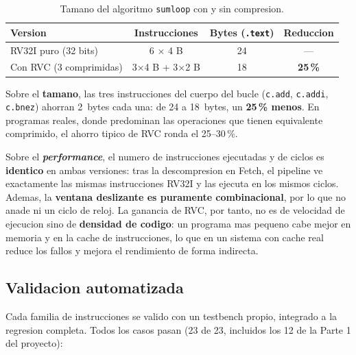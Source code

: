 \documentclass[11pt,a4paper]{article}
\begin{document}
\begin{table}[H]
	\centering
	\small
	\begin{tabular}{@{}lccc@{}}
		\toprule
		\textbf{Version} & \textbf{Instrucciones} & \textbf{Bytes (\texttt{.text})} & \textbf{Reduccion} \\
		\midrule
		RV32I puro (32 bits)      & 6 $\times$ 4 B          & 24 & --- \\
		Con RVC (3 comprimidas)   & 3$\times$4 B + 3$\times$2 B & 18 & \textbf{25\,\%} \\
		\bottomrule
	\end{tabular}
	\caption{Tamano del algoritmo \texttt{sumloop} con y sin compresion.}
	\label{cuadro:comparativa}
\end{table}

Sobre el \textbf{tamano}, las tres instrucciones del cuerpo del bucle
(\texttt{c.add}, \texttt{c.addi}, \texttt{c.bnez}) ahorran 2~bytes cada una: de
24 a 18~bytes, un \textbf{25\,\% menos}. En programas reales, donde predominan
las operaciones que tienen equivalente comprimido, el ahorro tipico de RVC ronda
el 25--30\,\%.

Sobre el \textbf{\textit{performance}}, el numero de instrucciones ejecutadas y
de ciclos es \textbf{identico} en ambas versiones: tras la descompresion en
Fetch, el pipeline ve exactamente las mismas instrucciones RV32I y las ejecuta
en los mismos ciclos. Ademas, la \textbf{ventana deslizante es puramente
combinacional}, por lo que no anade ni un ciclo de reloj. La ganancia de RVC,
por tanto, no es de velocidad de ejecucion sino de \textbf{densidad de codigo}:
un programa mas pequeno cabe mejor en memoria y en la cache de instrucciones,
lo que en un sistema con cache real reduce los fallos y mejora el rendimiento de
forma indirecta.

\subsection{Validacion automatizada}

Cada familia de instrucciones se valido con un testbench propio, integrado a la
regresion completa. Todos los casos pasan (23 de 23, incluidos los 12 de la Parte
1 del proyecto):
\end{document}
